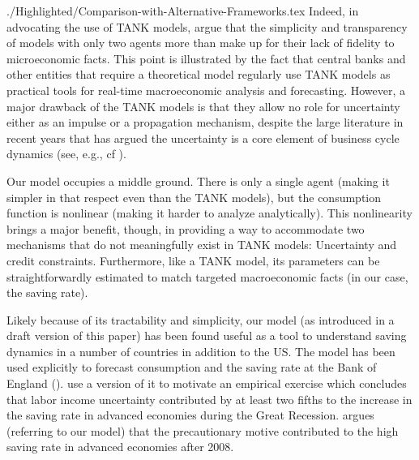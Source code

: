 \documentclass[titlepage]{\econtex}
\begin{document}
\begin{verbatimwrite}{./Highlighted/Comparison-with-Alternative-Frameworks.tex}
Indeed, in advocating the use of TANK models, \cite{dgTANK} argue that the simplicity and transparency of models with only two agents more than make up for their lack of fidelity to microeconomic facts.  This point is illustrated by the fact that central banks and other entities that require a theoretical model regularly use TANK models as practical tools for real-time macroeconomic analysis and forecasting. However, a major drawback of the TANK models is that they allow no role for uncertainty either as an impulse or a propagation mechanism, despite the large literature in recent years that has argued the uncertainty is a core element of business cycle dynamics (see, e.g., cf \cite{bfjstUncertain}).

Our  model occupies a middle ground. There is only a single agent (making it simpler in that respect even than the TANK models), but the consumption function is nonlinear (making it harder to analyze analytically).  This nonlinearity brings a major benefit, though, in providing a way to accommodate two mechanisms that do not meaningfully exist in TANK models: Uncertainty and credit constraints.  Furthermore, like a TANK model, its parameters can be straightforwardly estimated to match targeted macroeconomic facts (in our case, the saving rate).

\hypertarget{Our-Model-Has-Been-Used-In-Other-Countries}{}
Likely because of its tractability and simplicity, our model (as introduced in a draft version of this paper) has been found useful as a tool to understand saving dynamics in a number of countries in addition to the US. The model has been used explicitly to forecast consumption and the saving rate at the Bank of England (\cite{BoE_forecasting}).  \cite{modyEtAl_precSaving} use a version of it to motivate an empirical exercise which concludes that labor income uncertainty contributed by at least two fifths to the increase in the saving rate in advanced economies during the Great Recession. \cite{Trichet_JacksonHoleSpeech} argues (referring to our model) that the precautionary motive contributed to the high saving rate in advanced economies after 2008.

\end{verbatimwrite}
\end{document}
